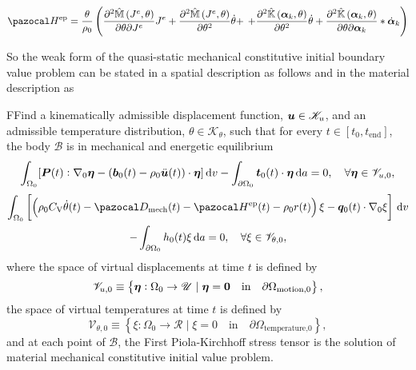 \begin{equation}
\pazocal H^\text{ep} =  \frac{\theta}{\rho_{0}}\left(\frac{\partial^{2} \hat{\mathbb{M}}\left(J^{e}, \theta\right)}{\partial \theta \partial J^{e}} J^{e}+\frac{\partial^{2} \hat{\mathbb{M}}\left(J^{e}, \theta\right)}{\partial \theta^{2}} \dot{\theta}+\right.
\left.+\frac{\partial^{2} \hat{\mathbb{K}}\left(\boldsymbol{\alpha}_{k}, \theta\right)}{\partial \theta^{2}} \dot{\theta}+\frac{\partial^{2} \hat{\mathbb{K}}\left(\boldsymbol{\alpha}_{k}, \theta\right)}{\partial \theta \partial \boldsymbol{\alpha}_{k}} * \dot{\bm\alpha}_{k}\right)
\end{equation}



So the weak form of the quasi-static mechanical constitutive initial boundary value problem can be stated in a spatial description as follows
and in the material description as
\begin{problem}
    FFind a kinematically admissible displacement function, $\bm{u}\in \mathscr{K}_u$, and an admissible temperature distribution, \(\theta \in \mathscr K_\theta\), such that for every $t\in [t_0,t_\text{end}]$, the body $\mathscr{B}$ is in mechanical and energetic equilibrium
        \begin{equation}
        \int_{\Omega_0} [\bm{P}(t):\nabla_0 \bm{\eta} - (\bm{b}_0(t)-\rho_0\ddot{\bm u}(t))\cdot \bm{\eta}]\,\mathrm{d} v - \int_{\partial\Omega_0} \bm{t}_0(t)\cdot \bm{\eta}\,\mathrm{d} a = 0,\quad \forall \bm{\eta} \in \mathscr{V}_{u,0},
        \end{equation}
        \begin{multline}
        \int_{\Omega_0}   \left[\left(\rho_0C_\mathrm{V}\dot\theta(t) -\pazocal D_\text{mech}(t) - \pazocal H^\text{ep}(t) - \rho_0 r(t)\right) \xi - \bm q_0(t)\cdot \nabla_0 \xi\right]\ud v\\ - \int_{\partial\Omega_0} h_0(t) \xi\ud a = 0,\quad \forall \xi \in \mathscr{V}_{\theta,0},
    \end{multline}
    where the space of virtual displacements at time $t$ is defined by
    \begin{equation}
        \mathscr{V}_{u,0} \equiv \left\{\bm{\eta}:\Omega_0\to \mathscr{U}\;|\;\bm{\eta} = \bm{0}\quad \text{in}\quad \partial\Omega_\text{motion,0}\right\},
    \end{equation}
    the space of virtual temperatures at time $t$ is defined by
    \begin{equation}
    \mathscr{V}_{\theta,0} \equiv \left\{\xi:\Omega_0\to \mathscr{R}\;|\; \xi =  0\quad \text{in}\quad \partial\Omega_\text{temperature,0}\right\},
    \end{equation}
    and at each point of $\mathscr{B}$, the First Piola-Kirchhoff stress tensor is the solution of material mechanical constitutive initial value problem.
\end{problem}

